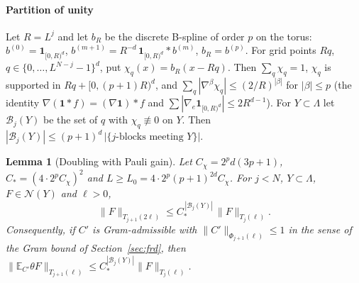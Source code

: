 \documentclass[11pt]{amsart}
\newtheorem{lemma}[theorem]{Lemma}
\theoremstyle{definition}
\theoremstyle{remark}
\numberwithin{equation}{section}
\newcommand{\E}{\mathbb{E}}
\newcommand{\cB}{\mathcal{B}}
\newcommand{\cN}{\mathcal{N}}
\begin{document}
\paragraph{Partition of unity}
Let $R=L^j$ and let $b_R$ be the discrete B-spline of order $p$ on the torus:
$b^{(0)}=\mathbf 1_{[0,R)^d}$, $b^{(m+1)}=R^{-d}\,\mathbf 1_{[0,R)^d}\ast b^{(m)}$, $b_R=b^{(p)}$.
For grid points $Rq$, $q\in\{0,\dots,L^{N-j}-1\}^d$, put $\chi_q(x)=b_R(x-Rq)$. Then
$\sum_q\chi_q=1$, $\chi_q$ is supported in $Rq+[0,(p+1)R)^d$, and
$\sum_q|\nabla^\beta\chi_q|\le(2/R)^{|\beta|}$ for $|\beta|\le p$ (the identity
$\nabla(\mathbf 1\ast f)=(\nabla\mathbf 1)\ast f$ and $\sum|\nabla_e\mathbf 1_{[0,R)^d}|\le2R^{d-1}$).
For $Y\subset\Lambda$ let $\cB_j(Y)$ be the set of $q$ with $\chi_q\not\equiv0$ on $Y$. Then
$|\cB_j(Y)|\le(p+1)^d\,|\{j\text{-blocks meeting }Y\}|$.

\begin{lemma}[Doubling with Pauli gain]\label{lem:pauli}
Let $C_\chi=2^pd(3p+1)$, $C_*=(4\cdot2^pC_\chi)^2$ and $L\ge L_0=4\cdot2^p(p+1)^{2d}C_\chi$.
For $j<N$, $Y\subset\Lambda$, $F\in\cN(Y)$ and $\ell>0$,
\[
  \|F\|_{T_{j+1}(2\ell)}\le C_*^{\,|\cB_j(Y)|}\,\|F\|_{T_j(\ell)} .
\]
Consequently, if $C'$ is Gram-admissible with $\|C'\|_{\Phi_{j+1}(\ell)}\le1$ in the sense of
the Gram bound of Section~\ref{sec:frd}, then
$\|\E_{C'}\theta F\|_{T_{j+1}(\ell)}\le C_*^{|\cB_j(Y)|}\|F\|_{T_j(\ell)}$.
\end{lemma}
\end{document}
